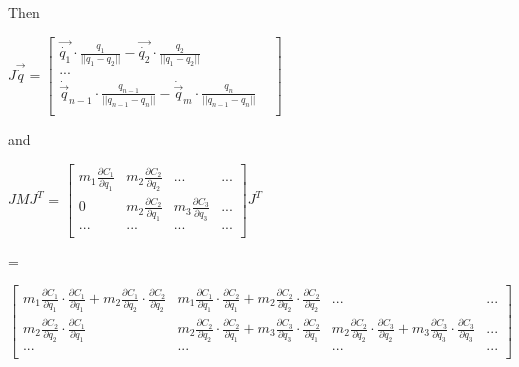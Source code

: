 \documentclass{article}
\begin{document}
\hfill

\noindent

Then 

\hfill

$J\vec{\dot{q}}
 = 
\begin{bmatrix}
	\vec{\dot{q_1}}\cdot\frac{q_1}{||q_1 - q_2||}  -\vec{\dot{q_2}}\cdot\frac{q_2}{||q_1 - q_2||}  \\
	... & \\
	\dot{\vec{q}}_{n-1}\cdot\frac{q_{n-1}}{||q_{n-1} - q_{n}||}  -\dot{\vec{q}}_m\cdot\frac{q_n}{||q_{n-1} - q_n||} \\
\end{bmatrix}	 
$

\hfill

and

\hfill

$JMJ^T$ = 
$
\begin{bmatrix}
	m_1 \frac{\partial{C_1}}{\partial{q_1}} & m_2 \frac{\partial{C_2}}{\partial{q_2}} & ... & ... \\
	0 & m_2 \frac{\partial{C_2}}{\partial{q_1}} & m_3 \frac{\partial{C_3}}{\partial{q_3}}& ...\\
	... & ... & ... & ...\\
\end{bmatrix}
J^T
$ 

= 

$
\begin{bmatrix}
	m_1 \frac{\partial{C_1}}{\partial{q_1}}\cdot  \frac{\partial{C_1}}{\partial{q_1}} + m_2 \frac{\partial{C_1}}{\partial{q_2}}\cdot  \frac{\partial{C_2}}{\partial{q_2}}		
&
m_1 \frac{\partial{C_1}}{\partial{q_1}}\cdot  \frac{\partial{C_2}}{\partial{q_1}} + m_2 \frac{\partial{C_2}}{\partial{q_2}}\cdot  \frac{\partial{C_2}}{\partial{q_2}}		
&
...
& 
...

\\

m_2 \frac{\partial{C_2}}{\partial{q_2}}\cdot  \frac{\partial{C_1}}{\partial{q_1}} 
&
m_2 \frac{\partial{C_2}}{\partial{q_2}}\cdot  \frac{\partial{C_2}}{\partial{q_1}} + m_3 \frac{\partial{C_3}}{\partial{q_3}}\cdot  \frac{\partial{C_2}}{\partial{q_1}}	
&
m_2 \frac{\partial{C_2}}{\partial{q_2}}\cdot  \frac{\partial{C_3}}{\partial{q_2}} + m_3 \frac{\partial{C_3}}{\partial{q_3}}\cdot  \frac{\partial{C_3}}{\partial{q_3}}	
&
...\\
...
&
...
&
...
&		
...
\\
 

\end{bmatrix}
$
\end{document}

